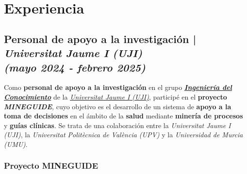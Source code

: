 \documentclass[letterpaper, 12pt, dvipsnames]{article}
\newcommand{\upvFull}{{\upvName} ({\upv})}
\newcommand{\upvName}{Universitat Politècnica de València}
\newcommand{\upv}{UPV}
\newcommand{\ujiFull}{{\ujiName} ({\uji})}
\newcommand{\ujiName}{Universitat Jaume I}
\newcommand{\uji}{UJI}
\newcommand{\ujiUrl}{https://www.uji.es/upo/rest/publicacion/idioma/es?urlRedirect=https://www.uji.es/&url=/}
\newcommand{\ujiGroup}{Ingeniería del Conocimiento}
\newcommand{\ujiGroupUrl}{https://www.uji.es/upo/rest/publicacion/idioma/es?urlRedirect=https://www.uji.es/serveis/ocit/base/grupsinvestigacio/detall/&url=/serveis/ocit/base/grupsinvestigacio/detall&codi=158}
\begin{document}
\begin{adjustwidth}{-1.5cm}{}
\end{adjustwidth}

\pagebreak

\section*{Experiencia}

\subsection*{Personal de apoyo a la investigación | \emph{\ujiFull}\\\textit{\large (mayo 2024 - febrero 2025)}}

Como \textbf{personal de apoyo a la investigación} en el grupo \emph{\textbf{\href{\ujiGroupUrl}{\ujiGroup}}} de la \emph{\href{\ujiUrl}{\ujiFull}}, participé en el \textbf{proyecto \emph{MINEGUIDE}}, cuyo objetivo es el desarrollo de un sistema de \textbf{apoyo a la toma de decisiones} en el ámbito de la \textbf{salud} mediante \textbf{minería de procesos} y \textbf{guías clínicas}. Se trata de una colaboración entre la \emph{\ujiFull}, la \emph{\upvFull} y la \emph{Universidad de Murcia (UMU)}.

\subsubsection*{Proyecto MINEGUIDE}
\end{document}
